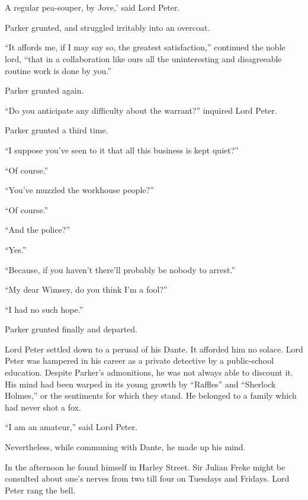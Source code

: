 \chapter[Chapter \thechapter]{}
\lettrine[lines=4,ante=‘]{A}{} regular pea-souper, by Jove,' said Lord Peter.

\zz
Parker grunted, and struggled irritably into an overcoat.

\zz
\enquote{It affords me, if I may say so, the greatest satisfaction,} continued the noble lord, \enquote{that in a collaboration like ours all the uninteresting and disagreeable routine work is done by you.}

Parker grunted again.

\enquote{Do you anticipate any difficulty about the warrant?} inquired Lord Peter.

Parker grunted a third time.

\enquote{I suppose you’ve seen to it that all this business is kept quiet?}

\enquote{Of course.}

\enquote{You’ve muzzled the workhouse people?}

\enquote{Of course.}

\enquote{And the police?}

\enquote{Yes.}

\enquote{Because, if you haven’t there’ll probably be nobody to arrest.}

\enquote{My dear Wimsey, do you think I’m a fool?}

\enquote{I had no such hope.}

Parker grunted finally and departed.

Lord Peter settled down to a perusal of his Dante. It afforded him no solace. Lord Peter was hampered in his career as a private detective by a public-school education. Despite Parker’s admonitions, he was not always able to discount it. His mind had been warped in its young growth by \enquote{Raffles} and \enquote{Sherlock Holmes,} or the sentiments for which they stand. He belonged to a family which had never shot a fox.

\enquote{I am an amateur,} said Lord Peter.

Nevertheless, while communing with Dante, he made up his mind.

In the afternoon he found himself in Harley Street. Sir Julian Freke might be consulted about one’s nerves from two till four on Tuesdays and Fridays. Lord Peter rang the bell.

